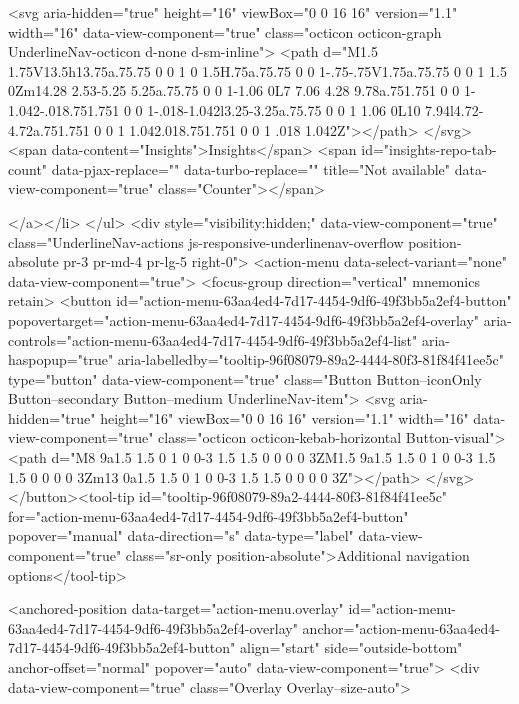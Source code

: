               <svg aria-hidden="true" height="16" viewBox="0 0 16 16" version="1.1" width="16" data-view-component="true" class="octicon octicon-graph UnderlineNav-octicon d-none d-sm-inline">
    <path d="M1.5 1.75V13.5h13.75a.75.75 0 0 1 0 1.5H.75a.75.75 0 0 1-.75-.75V1.75a.75.75 0 0 1 1.5 0Zm14.28 2.53-5.25 5.25a.75.75 0 0 1-1.06 0L7 7.06 4.28 9.78a.751.751 0 0 1-1.042-.018.751.751 0 0 1-.018-1.042l3.25-3.25a.75.75 0 0 1 1.06 0L10 7.94l4.72-4.72a.751.751 0 0 1 1.042.018.751.751 0 0 1 .018 1.042Z"></path>
</svg>
        <span data-content="Insights">Insights</span>
          <span id="insights-repo-tab-count" data-pjax-replace="" data-turbo-replace="" title="Not available" data-view-component="true" class="Counter"></span>


    
</a></li>
</ul>
    <div style="visibility:hidden;" data-view-component="true" class="UnderlineNav-actions js-responsive-underlinenav-overflow position-absolute pr-3 pr-md-4 pr-lg-5 right-0">      <action-menu data-select-variant="none" data-view-component="true">
  <focus-group direction="vertical" mnemonics retain>
    <button id="action-menu-63aa4ed4-7d17-4454-9df6-49f3bb5a2ef4-button" popovertarget="action-menu-63aa4ed4-7d17-4454-9df6-49f3bb5a2ef4-overlay" aria-controls="action-menu-63aa4ed4-7d17-4454-9df6-49f3bb5a2ef4-list" aria-haspopup="true" aria-labelledby="tooltip-96f08079-89a2-4444-80f3-81f84f41ee5c" type="button" data-view-component="true" class="Button Button--iconOnly Button--secondary Button--medium UnderlineNav-item">  <svg aria-hidden="true" height="16" viewBox="0 0 16 16" version="1.1" width="16" data-view-component="true" class="octicon octicon-kebab-horizontal Button-visual">
    <path d="M8 9a1.5 1.5 0 1 0 0-3 1.5 1.5 0 0 0 0 3ZM1.5 9a1.5 1.5 0 1 0 0-3 1.5 1.5 0 0 0 0 3Zm13 0a1.5 1.5 0 1 0 0-3 1.5 1.5 0 0 0 0 3Z"></path>
</svg>
</button><tool-tip id="tooltip-96f08079-89a2-4444-80f3-81f84f41ee5c" for="action-menu-63aa4ed4-7d17-4454-9df6-49f3bb5a2ef4-button" popover="manual" data-direction="s" data-type="label" data-view-component="true" class="sr-only position-absolute">Additional navigation options</tool-tip>


<anchored-position data-target="action-menu.overlay" id="action-menu-63aa4ed4-7d17-4454-9df6-49f3bb5a2ef4-overlay" anchor="action-menu-63aa4ed4-7d17-4454-9df6-49f3bb5a2ef4-button" align="start" side="outside-bottom" anchor-offset="normal" popover="auto" data-view-component="true">
  <div data-view-component="true" class="Overlay Overlay--size-auto">
    
